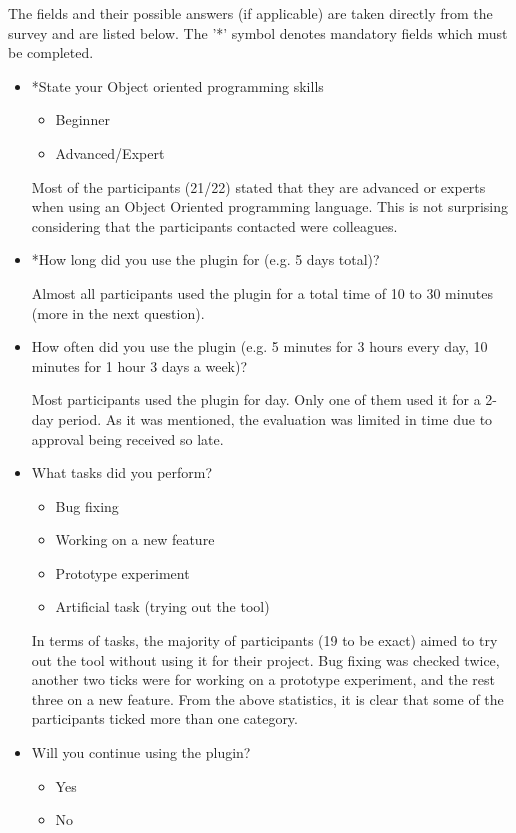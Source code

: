 \documentclass{l4proj}
\begin{document}
The fields and their possible answers (if applicable) are taken directly from the survey and are listed below. The '*' symbol denotes mandatory fields which must be completed.

\begin{itemize}
\item *State your Object oriented programming skills
\begin{itemize}
\item Beginner
\item Advanced/Expert
\end{itemize}

Most of the participants (21/22) stated that they are advanced or experts when using an Object Oriented programming language. This is not surprising considering that the participants contacted were colleagues.

\item *How long did you use the plugin for (e.g. 5 days total)?

Almost all participants used the plugin for a total time of 10 to 30 minutes (more in the next question). 

\item How often did you use the plugin (e.g. 5 minutes for 3 hours every day, 10 minutes for 1 hour 3 days a week)?

Most participants used the plugin for day. Only one of them used it for a 2-day period. As it was mentioned, the evaluation was limited in time due to approval being received so late.

\item What tasks did you perform?
\begin{itemize}
\item Bug fixing
\item Working on a new feature
\item Prototype experiment
\item Artificial task (trying out the tool)
\end{itemize}

In terms of tasks, the majority of participants (19 to be exact) aimed to try out the tool without using it for their project. Bug fixing was checked twice, another two ticks were for working on a prototype experiment, and the rest three on a new feature. From the above statistics, it is clear that some of the participants ticked more than one category. 

\item Will you continue using the plugin?
\begin{itemize}
\item Yes
\item No
\end{itemize}


\end{itemize}
\end{document}
